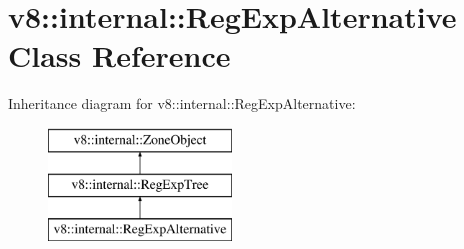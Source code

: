 \hypertarget{classv8_1_1internal_1_1_reg_exp_alternative}{}\section{v8\+:\+:internal\+:\+:Reg\+Exp\+Alternative Class Reference}
\label{classv8_1_1internal_1_1_reg_exp_alternative}
Inheritance diagram for v8\+:\+:internal\+:\+:Reg\+Exp\+Alternative\+:\begin{figure}[H]
\begin{center}
\leavevmode
\includegraphics[height=3.000000cm]{classv8_1_1internal_1_1_reg_exp_alternative}
\end{center}
\end{figure}

